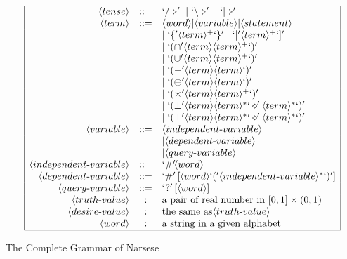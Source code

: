 \begin{table}[hbt]
\[\begin{array}{|rcl|}
\langle tense \rangle & ::= & `/\!\!\!\Rightarrow' \; | \; `\backslash\!\!\!\Rightarrow' \; | \; `|\!\!\!\Rightarrow' \\
\langle term \rangle & ::= & \langle word \rangle | \langle  variable \rangle | \langle statement \rangle \\ &&
                     | \; `\{' \langle term \rangle ^+ `\}' \; | \; `[' \langle term \rangle ^+ `]' \\ &&
                     | \; `(\cap' \langle term \rangle \langle term \rangle ^+ `)' \\ &&
                     | \; `(\cup' \langle term \rangle \langle term \rangle ^+ `)' \\ &&
                     | \; `(-' \langle term \rangle \langle term \rangle `)' \\ &&
                     | \; `(\ominus' \langle term \rangle \langle term \rangle `)' \\ &&
                     | \; `(\times' \langle term \rangle \langle term \rangle ^+ `)' \\ &&
                     | \; `(\bot' \langle term \rangle \langle term \rangle ^* `\diamond' \langle term \rangle ^* `)' \\ &&
                     | \; `(\top' \langle term \rangle \langle term \rangle ^* `\diamond' \langle term \rangle ^* `)' \\ 
\langle variable \rangle & ::= & \langle independent \mbox{-} variable \rangle \\ &&
                     | \langle dependent \mbox{-} variable \rangle \\ &&
                     | \langle query \mbox{-} variable \rangle \\
\langle independent \mbox{-} variable \rangle & ::= & `\#'\!\langle word \rangle  \\
\langle dependent \mbox{-} variable \rangle  & ::= & `\#' \, [ \langle word \rangle `('\langle independent \mbox{-} variable \rangle ^* `)' ] \\
\langle query \mbox{-} variable \rangle & ::= & `?' \, [ \langle word \rangle ] \\
\langle truth \mbox{-} value \rangle  & : & \mbox{a pair of real number in } [0, 1] \times(0, 1) \\
\langle desire \mbox{-} value \rangle  & : & \mbox{the same as} \langle  truth \mbox{-} value \rangle  \\
\langle word \rangle  & : & \mbox{a string in a given alphabet} \\			
\hline \end{array} \]
\caption{The Complete Grammar of Narsese}
\label{Narsese-Grammar}
\end{table}

